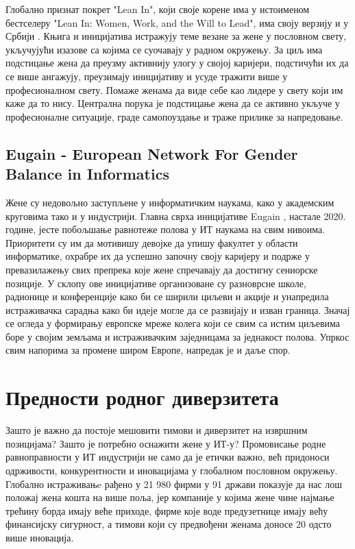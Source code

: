 \documentclass[a4paper]{article}
\begin{document}
Глобално признат покрет "Lean In", који своје корене има у истоименом бестселеру
"Lean In: Women, Work, and the Will to Lead", има своју верзију и у Србији \cite{lean}. 
Књига и иницијатива истражују теме везане за жене у пословном свету, укључујући изазове 
са којима се суочавају у радном окружењу. За циљ има подстицање жена да преузму
активнију улогу у својој каријери, подстичући их да се више ангажују, преузимају 
иницијативу и усуде тражити више у професионалном свету. Помаже женама да виде 
себе као лидере у свету који им каже да то нису. Централна порука је подстицање 
жена да се активно укључе у професионалне ситуације, граде самопоуздање и траже 
прилике за напредовање.


\subsection{Eugain - European Network For Gender Balance in Informatics}
\label{subsec:podnaslov3}

Жене су недовољно заступљене у информатичким наукама, како у академским 
круговима тако и у индустрији. Главна сврха иницијативе Eugain \cite{eugain}, настале 2020. 
године, јесте побољшање равнотеже полова у ИТ наукама на свим нивоима. Приоритети 
су им да мотивишу девојке да упишу факултет у области информатике, охрабре их 
да успешно започну своју каријеру и подрже у превазилажењу свих препрека које жене 
спречавају да достигну сениорске позиције. У склопу ове иницијативе организоване 
су разноврсне школе, радионице и конференције како би се ширили циљеви и акције и 
унапредила истраживачка сарадња како би идеје могле да се развијају и изван граница. 
Значај се огледа у формирању европске мреже колега који се свим са истим циљевима 
боре у својим земљама и истраживачким заједницама за једнакост полова. Упркос 
свим напорима за промене широм Европе, напредак је и даље спор.

\section{Предности родног диверзитета} 
\label{sec:prednosti}
Зашто је важно да постоје мешовити тимови и диверзитет на извршним позицијама? 
Зашто је потребно оснажити жене у ИТ-у? Промовисање родне равноправности у ИТ
индустрији не само да је етички важно, већ придоноси одрживости, конкурентности
и иновацијама у глобалном пословном окружењу. Глобално истраживањe рађено у 21 980 
фирми у 91 држави \cite{prednosti} показује да нас лош положај жена кошта на више поља,
јер компаније у којима жене чине најмање трећину борда имају веће приходе, фирме
које воде предузетнице имају већу финансијску сигурност, а тимови који су предвођени
женама доносе 20 одсто више иновација. 
\end{document}
